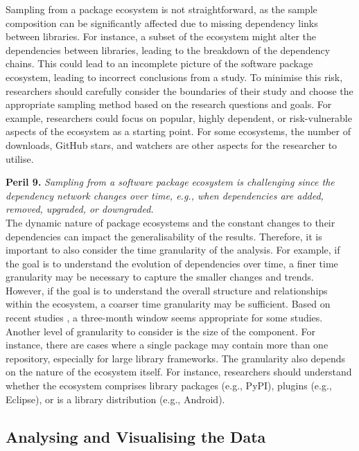 Sampling from a package ecosystem is not straightforward, as the sample composition can be significantly affected due to missing dependency links between libraries. For instance, a subset of the ecosystem might alter the dependencies between libraries, leading to the breakdown of the dependency chains. This could lead to an incomplete picture of the software package ecosystem, leading to incorrect conclusions from a study. To minimise this risk, researchers should carefully consider the boundaries of their study and choose the appropriate sampling method based on the research questions and goals. For example, researchers could focus on popular, highly dependent, or risk-vulnerable aspects of the ecosystem as a starting point. 
For some ecosystems, the number of downloads, GitHub stars, and watchers are other aspects for the researcher to utilise.


\smallskip\noindent\textbf{Peril 9.}\textit{
Sampling from a software package ecosystem is challenging since the dependency network changes over time, e.g., when dependencies are added, removed, upgraded, or downgraded.
}\\

The dynamic nature of package ecosystems and the constant changes to their dependencies can impact the generalisability of the results. Therefore, it is important to also consider the time granularity of the analysis. For example, if the goal is to understand the evolution of dependencies over time, a finer time granularity may be necessary to capture the smaller changes and trends. However, if the goal is to understand the overall structure and relationships within the ecosystem, a coarser time granularity may be sufficient. Based on recent studies \cite{wattanakriengkrai2022giving,valiev2018ecosystem,Mirsaeedi:icse2020, Brindescu:emse2020, Nassif:icsme2017}, a three-month window seems appropriate for some studies.
Another level of granularity to consider is the size of the component. For instance, there are cases where a single package may contain more than one repository, especially for large library frameworks. 
The granularity also depends on the nature of the ecosystem itself. For instance, researchers should understand whether the ecosystem comprises library packages (e.g., PyPI), plugins (e.g., Eclipse), or is a library distribution (e.g., Android).



\subsection{Analysing and Visualising the Data}

